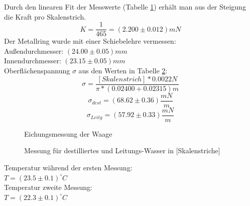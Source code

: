 \documentclass[12pt,a4paper]{article}
\begin{document}
\begin{multicols}{2}
\noindent
Durch den linearen Fit der Messwerte (Tabelle \ref{fig:oberflaeche_eichung}) erhält man aus der Steigung die Kraft pro Skalenstrich. 
$$K = \frac{1}{465} = (2.200\pm 0.012)mN$$ 
Der Metallring wurde mit einer Schiebelehre vermessen:\\
Außendurchmesser: $(24.00 \pm 0.05)mm$\\
Innendurchmesser: $(23.15 \pm 0.05)mm$\\
Oberflächenspannung $\sigma$ aus den Werten in Tabelle \ref{fig:oberflaeche_messung}:
$$\sigma = \frac{[Skalenstrich] * 0.0022N}{\pi * (0.02400 + 0.02315)m} $$ 
$$\sigma_{dest}= (68.62 \pm 0.36) \frac{mN}{m}$$ %
$$ \sigma_{Leitg} = (57.92 \pm 0.33) \frac{mN}{m}$$





\begin{figure}[H]
	\centering
	\caption{Eichungsmessung der Waage}
	\label{fig:oberflaeche_eichung}
\end{figure}
\noindent

\begin{figure}[H]
	\centering
	\caption{Messung für destilliertes und Leitungs-Wasser in [Skalenstriche]}
	\label{fig:oberflaeche_messung}
\end{figure}

\noindent
Temperatur während der ersten Messung:\\
\indent$T=(23.5 \pm 0.1)^{\circ}C$\\
Temperatur zweite Messung:\\
\indent$T=(22.3 \pm 0.1)^{\circ}C$\\


\end{multicols}
\end{document}
